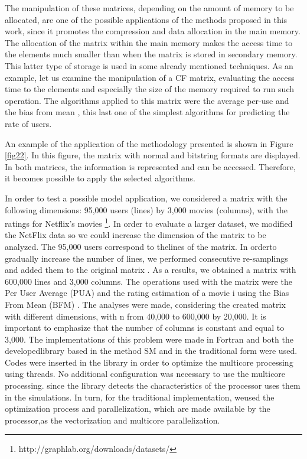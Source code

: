 \documentclass[10pt]{article}
\begin{document}
The manipulation of these matrices, depending on the amount of memory to be 
allocated, are one of the possible 
applications of the methods proposed in this work, since it promotes the 
compression and data allocation in the main 
memory. The allocation of the matrix within the main memory makes the access 
time to the elements much smaller than when 
the matrix is stored in secondary memory. This latter type of storage is used in 
some already mentioned techniques. As 
an example, let us examine the manipulation of a CF matrix, evaluating the 
access time to the elements and especially 
the size of the memory required to run such operation. The algorithms applied to 
this matrix were the average per-use 
and the bias from mean \cite{cf}, this last one of the simplest algorithms for 
predicting the rate of users.

An example of the application of the methodology presented is shown in Figure 
\ref{fig22}. In this figure, the matrix 
with normal and bitstring formats are displayed. In both matrices, the 
information is represented and can be accessed. 
Therefore, it becomes possible to apply the selected algorithms.

In order to test a possible model application, we considered a matrix with the 
following dimensions: 95,000 users 
(lines) by 3,000 movies (columns), with the ratings for Netflix’s movies
\footnote{http://graphlab.org/downloads/datasets/}. In order to evaluate a 
larger dataset, we modified the 
NetFlix data so we could increase the dimension of the matrix to be analyzed. 
The 95,000 users correspond to 
thelines of the matrix. In orderto gradually increase the number of lines, we 
performed consecutive re-samplings 
and added them to the original matrix . As a results, we obtained a  matrix with 
600,000 lines and 3,000 columns. 
The operations used with the matrix were the Per User Average (PUA) and the 
rating estimation of a movie i using 
the Bias From Mean (BFM) \cite{cf}. The analyses were  made, considering the 
created matrix with different dimensions, 
with n from 40,000 to 600,000 by 20,000. It is important to emphasize that the 
number of columns is constant and 
equal to 3,000. The implementations of this problem were made in Fortran and 
both the developedlibrary based in 
the method SM and in the traditional form were used. Codes were inserted in the 
library in order to optimize the 
multicore processing using threads. No additional configuration was necessary to 
use the multicore processing. 
since the library detects the characteristics of the processor uses them in the 
simulations. In turn, for the 
traditional implementation, weused the optimization process and parallelization, 
which are made available by 
the processor,as the vectorization and multicore parallelization.
\end{document}
